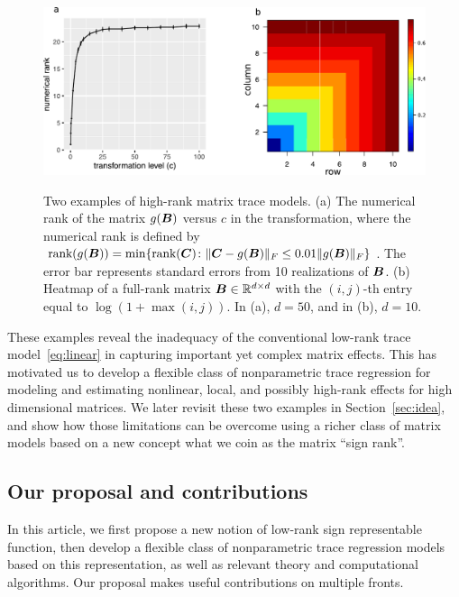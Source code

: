 \documentclass[11pt]{article}
\theoremstyle{plain}
\theoremstyle{definition}
\def\rank{\textup{rank}}
\begin{document}
\begin{figure}
\begin{center}
\includegraphics[width=.8\textwidth]{figure/low_rank.pdf}
\caption{Two examples of high-rank matrix trace models. (a) The numerical rank of the matrix $g(\bm B)$ versus $c$ in the transformation, where the numerical rank is defined by $\rank(g(\mB))=\min\{\rank(\mC )\colon \FnormSize{}{\mC-g(\mB)} \leq 0.01 \FnormSize{}{g(\mB)} \}$. The error bar represents standard errors from 10 realizations of $\bm B$. (b) Heatmap of a full-rank matrix $\bm B\in\mathbb{R}^{d\times d}$ with the $(i,j)$-th entry equal to $\log(1+\max(i,j))$. In (a), $d=50$, and in (b), $d=10$.} 
\label{fig:limit}
\label{penG}
\end{center}
\end{figure}

These examples reveal the inadequacy of the conventional low-rank trace model~\eqref{eq:linear} in capturing important yet complex matrix effects. This has motivated us to develop a flexible class of nonparametric trace regression for modeling and estimating nonlinear, local, and possibly high-rank effects for high dimensional matrices. We later revisit these two examples in Section~\ref{sec:idea}, and show how those limitations can be overcome using a richer class of matrix models based on a new concept what we coin as the matrix ``sign rank''. 



\subsection{Our proposal and contributions}

In this article, we first propose a new notion of low-rank sign representable function, then develop a flexible class of nonparametric trace regression models based on this representation, as well as relevant theory and computational algorithms. Our proposal makes useful contributions on multiple fronts. 
\end{document}
